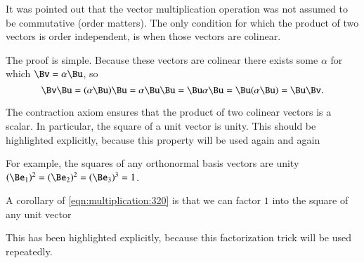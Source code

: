 %
%
It was pointed out that the vector multiplication operation was not assumed to be commutative (order matters).
The only condition for which the product of two vectors is order independent, is when those vectors are colinear.


The proof is simple.
Because these vectors are colinear there exists some \( \alpha \) for which \( \Bv = \alpha \Bu \), so
\begin{dmath}\label{eqn:colinearVectors:380}
\Bv \Bu
=
(\alpha \Bu) \Bu
=
\alpha \Bu \Bu
=
\Bu \alpha \Bu
=
\Bu (\alpha \Bu)
=
\Bu \Bv.
\end{dmath}

The contraction axiom ensures that the product of two colinear vectors is a scalar.
In particular, the square of a unit vector is unity.
This should be highlighted explicitly, because this property will be used again and again

For example, the squares of any orthonormal basis vectors are unity \( (\Be_1)^2 = (\Be_2)^2 = (\Be_3)^3 = 1 \).

A corollary of
\cref{eqn:multiplication:320} is that we can factor \( 1 \) into
the square of any unit vector

This has been highlighted explicitly, because this factorization trick will be used repeatedly.
